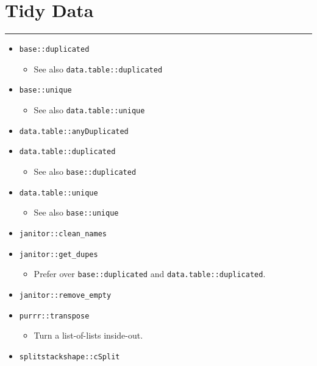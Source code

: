 \documentclass[
]{book}
\providecommand{\tightlist}{%
  \setlength{\itemsep}{0pt}\setlength{\parskip}{0pt}}
\begin{document}
\hypertarget{tidy-data}{%
\section{Tidy Data}\label{tidy-data}}

\begin{center}\rule{0.5\linewidth}{0.5pt}\end{center}

\begin{itemize}
\tightlist
\item
  \texttt{base::duplicated}

  \begin{itemize}
  \tightlist
  \item
    See also \texttt{data.table::duplicated}
  \end{itemize}
\item
  \texttt{base::unique}

  \begin{itemize}
  \tightlist
  \item
    See also \texttt{data.table::unique}
  \end{itemize}
\item
  \texttt{data.table::anyDuplicated}
\item
  \texttt{data.table::duplicated}

  \begin{itemize}
  \tightlist
  \item
    See also \texttt{base::duplicated}
  \end{itemize}
\item
  \texttt{data.table::unique}

  \begin{itemize}
  \tightlist
  \item
    See also \texttt{base::unique}
  \end{itemize}
\item
  \texttt{janitor::clean\_names}
\item
  \texttt{janitor::get\_dupes}

  \begin{itemize}
  \tightlist
  \item
    Prefer over \texttt{base::duplicated} and \texttt{data.table::duplicated}.
  \end{itemize}
\item
  \texttt{janitor::remove\_empty}
\item
  \texttt{purrr::transpose}

  \begin{itemize}
  \tightlist
  \item
    Turn a list-of-lists inside-out.
  \end{itemize}
\item
  \texttt{splitstackshape::cSplit}


\end{itemize}
\end{document}
